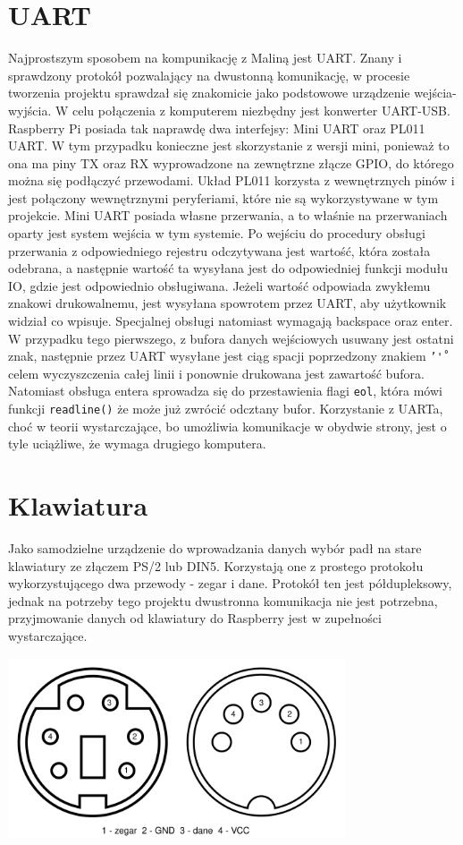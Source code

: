 \documentclass[shortabstract]{iithesis}
\begin{document}
\section{UART}
Najprostszym sposobem na kompunikację z Maliną jest UART. Znany i sprawdzony protokół pozwalający na dwustonną komunikację, w procesie tworzenia projektu sprawdzał się znakomicie jako podstowowe urządzenie wejścia-wyjścia. W celu połączenia z komputerem niezbędny jest konwerter UART-USB.
Raspberry Pi posiada tak naprawdę dwa interfejsy: Mini UART oraz PL011 UART. W tym przypadku konieczne jest skorzystanie z wersji mini, ponieważ to ona ma piny TX oraz RX wyprowadzone na zewnętrzne złącze GPIO, do którego można się podłączyć przewodami. Układ PL011 korzysta z wewnętrznych pinów i jest połączony wewnętrznymi peryferiami, które nie są wykorzystywane w tym projekcie.
Mini UART posiada własne przerwania, a to właśnie na przerwaniach oparty jest system wejścia w tym systemie. Po wejściu do procedury obsługi przerwania z odpowiedniego rejestru odczytywana jest wartość, która została odebrana, a następnie wartość ta wysyłana jest do odpowiedniej funkcji modułu IO, gdzie jest odpowiednio obsługiwana. Jeżeli wartość odpowiada zwykłemu znakowi drukowalnemu, jest wysyłana spowrotem przez UART, aby użytkownik widział co wpisuje. Specjalnej obsługi natomiast wymagają backspace oraz enter. W przypadku tego pierwszego, z bufora danych wejściowych usuwany jest ostatni znak, następnie przez UART wysyłane jest ciąg spacji poprzedzony znakiem \texttt{'\r'} celem wyczyszczenia całej linii i ponownie drukowana jest zawartość bufora. Natomiast obsługa entera sprowadza się do przestawienia flagi \texttt{eol}, która mówi funkcji \texttt{readline()} że może już zwrócić odcztany bufor.
 Korzystanie z UARTa, choć w teorii wystarczające, bo umożliwia komunikacje w obydwie strony, jest o tyle uciążliwe, że wymaga drugiego komputera.

\section{Klawiatura}
Jako samodzielne urządzenie do wprowadzania danych wybór padł na stare klawiatury ze złączem PS/2 lub DIN5. Korzystają one z prostego protokołu wykorzystującego dwa przewody - zegar i dane. Protokół ten jest półdupleksowy, jednak na potrzeby tego projektu dwustronna komunikacja nie jest potrzebna, przyjmowanie danych od klawiatury do Raspberry jest w zupełności wystarczające.

\begingroup
\centering
\includegraphics[width=0.75\textwidth]{pinout.png}
\endgroup
\end{document}
